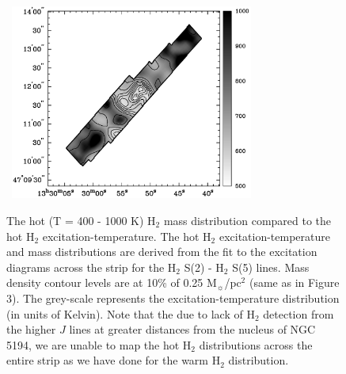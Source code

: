 \documentclass[manuscript]{aastex}
\begin{document}
\clearpage
\begin{figure}[!h]
\centerline{\hbox{\hspace{0.0in}
\includegraphics[width=8cm,angle=0]{bw_hot_h2.jpg}}}
\caption{The hot (T = 400 - 1000 K) $\mathrm{H_2}$ mass distribution compared to the hot $\mathrm{H_2}$ excitation-temperature.  The hot $\mathrm{H_2}$ excitation-temperature and mass distributions are derived from the fit to the excitation diagrams across the strip for the $\mathrm{H_2}$ S(2) - $\mathrm{H_2}$ S(5) lines.  Mass density contour levels are at 10\% of 0.25 $\mathrm{M_\sun}$/$\mathrm{pc^2}$ (same as in Figure 3). 
The grey-scale represents the excitation-temperature distribution (in units of Kelvin).  Note that the due to lack of $\mathrm{H_2}$ detection from the higher $J$ lines at greater distances from the nucleus of NGC 5194, we are unable to map the hot $\mathrm{H_2}$ distributions across the entire strip as we have done for the warm $\mathrm{H_2}$ distribution.\label{fig5}}
\end{figure}
\end{document}
